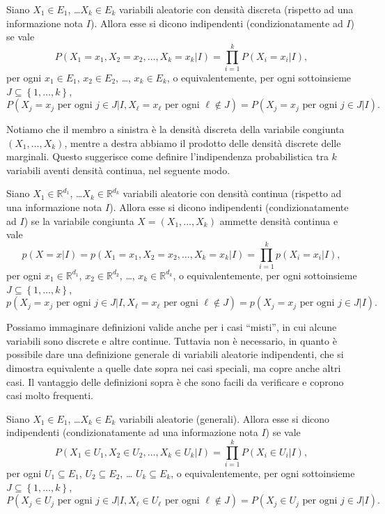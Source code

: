 \documentclass[
  italian,
  letterpaper,
]{book}
\newcommand{\cur}[1]{\left\{ #1 \right\}}
\newcommand{\R}{\mathbb{R}}
\theoremstyle{definition}
\theoremstyle{remark}
\begin{document}
Siano \(X_1\in E_1\), \ldots \(X_k\in E_k\) variabili aleatorie con
densità discreta (rispetto ad una informazione nota \(I\)). Allora esse
si dicono indipendenti (condizionatamente ad \(I\)) se vale
\[ P( X_1 =x_1, X_2 = x_2, \ldots, X_k=x_k|I) = \prod_{i=1}^k P(X_i = x_i|I),\]
per ogni \(x_1 \in E_1\), \(x_2 \in E_2\), \ldots, \(x_k \in E_k\), o
equivalentemente, per ogni sottoinsieme
\(J \subseteq \cur{1, \ldots, k}\),
\[ P( X_j =x_j \text{ per ogni $j \in J$} |I,X_\ell = x_\ell \text{ per ogni $\ell \notin J$}  ) =  P(X_j = x_j \text{ per ogni $j \in J$} |I ). \]

Notiamo che il membro a sinistra è la densità discreta della variabile
congiunta \((X_1, \ldots, X_k)\), mentre a destra abbiamo il prodotto
delle densità discrete delle marginali. Questo suggerisce come definire
l'indipendenza probabilistica tra \(k\) variabili aventi densità
continua, nel seguente modo.

Siano \(X_1\in \R^{d_1}\), \ldots \(X_k\in \R^{d_k}\) variabili
aleatorie con densità continua (rispetto ad una informazione nota
\(I\)). Allora esse si dicono indipendenti (condizionatamente ad \(I\))
se la variabile congiunta \(X = (X_1, \ldots, X_k)\) ammette densità
continua e vale
\[ p(X = x| I ) = p( X_1 =x_1, X_2 = x_2, \ldots, X_k=x_k|I) = \prod_{i=1}^k p(X_i = x_i|I),\]
per ogni \(x_1 \in \R^{d_1}\), \(x_2 \in \R^{d_2}\), \ldots,
\(x_k \in \R^{d_k}\), o equivalentemente, per ogni sottoinsieme
\(J \subseteq \cur{1, \ldots, k}\),
\[ p( X_j =x_j \text{ per ogni $j \in J$} |I,X_\ell = x_\ell \text{ per ogni $\ell \notin J$}  ) =  p(X_j = x_j \text{ per ogni $j \in J$} |I ). \]

Possiamo immaginare definizioni valide anche per i casi ``misti'', in
cui alcune variabili sono discrete e altre continue. Tuttavia non è
necessario, in quanto è possibile dare una definizione generale di
variabili aleatorie indipendenti, che si dimostra equivalente a quelle
date sopra nei casi speciali, ma copre anche altri casi. Il vantaggio
delle definizioni sopra è che sono facili da verificare e coprono casi
molto frequenti.

Siano \(X_1\in E_1\), \ldots \(X_k\in E_k\) variabili aleatorie
(generali). Allora esse si dicono indipendenti (condizionatamente ad una
informazione nota \(I\)) se vale
\[  P( X_1 \in U_1, X_2 \in U_2, \ldots, X_k \in U_k |I) = \prod_{i=1}^k P(X_i \in U_i |I),\]
per ogni \(U_1 \subseteq E_1\), \(U_2 \subseteq E_2\), \ldots{}
\(U_k \subseteq E_k\), o equivalentemente, per ogni sottoinsieme
\(J \subseteq \cur{1, \ldots, k}\),
\[ P( X_j \in U_j \text{ per ogni $j \in J$} |I,X_\ell\in U_\ell \text{ per ogni $\ell \notin J$}  ) =  P(X_j \in U_j \text{ per ogni $j \in J$} |I ). \]
\end{document}
